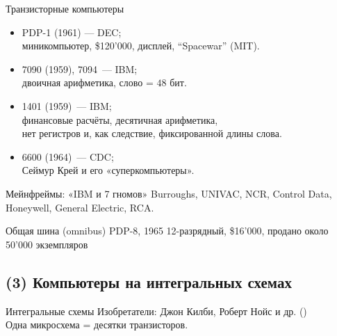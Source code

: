 \begin{frame}{Транзисторные компьютеры}
\pause
\begin{itemize}[<+->]
    \item PDP-1 (1961) — DEC;\\
        {\small миникомпьютер, \$120'000, дисплей, “Spacewar” (MIT).}

    \item 7090 (1959), 7094~— IBM;\\
        {\small двоичная арифметика, слово = $48$ бит.}

    \item 1401 (1959)~— IBM;\\
        {\small финансовые расчёты, десятичная арифметика,\\
        нет регистров и, как следствие, фиксированной длины слова.}

    \item 6600 (1964)~— CDC;\\
        {\small Сеймур Крей и его «суперкомпьютеры».}
\end{itemize}

\pause
\begin{block}{Мейнфреймы: «IBM и 7 гномов»}
Burroughs, UNIVAC, NCR, Control Data, Honeywell, General Electric, RCA.
\end{block}
\end{frame}

\begin{frame}{Общая шина (omnibus) PDP-8, 1965}
12-разрядный, \$16'000, продано около 50'000 экземпляров
\end{frame}

\subsection {(3) Компьютеры на интегральных схемах}

\begin{frame}{Интегральные схемы}
\vspace{-.3cm}
Изобретатели: Джон Килби, Роберт Нойс и др. ()\\
Одна микросхема = десятки транзисторов.
\end{frame}

